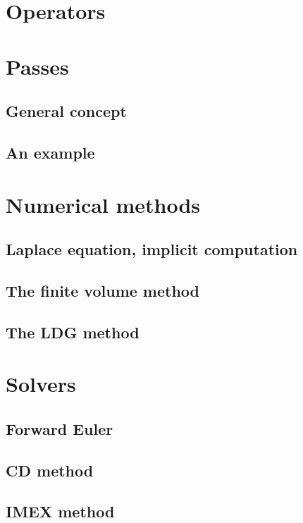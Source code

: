 \chapter{Operators}




\chapter{Passes}


\section{General concept}

\section{An example}



\chapter{Numerical methods}


\section{Laplace equation, implicit computation}

\section{The finite volume method}


\section{The LDG method}



\chapter{Solvers}


\section{Forward Euler}


\section{CD method}


\section{IMEX method}


